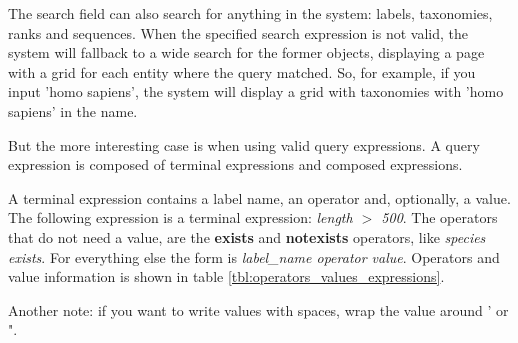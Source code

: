 The search field can also search for anything in the system: labels, taxonomies, ranks and sequences.
When the specified search expression is not valid, the system will fallback to a wide search for the
former objects, displaying a page with a grid for each entity where the query matched. So, for example,
if you input 'homo sapiens', the system will display a grid with taxonomies with 'homo sapiens' in the name.

But the more interesting case is when using valid query expressions. A query expression
is composed of terminal expressions and composed expressions.

A terminal expression contains a label name, an operator and, optionally, a value.
The following expression is a terminal expression: \textit{length $>$ 500}. The operators that
do not need a value, are the \textbf{exists} and \textbf{notexists} operators, like \textit{species exists}.
For everything else the form is \textit{label\_name operator value}. Operators and value information
is shown in table \ref{tbl:operators_values_expressions}.

Another note: if you want to write values with spaces, wrap the value around ' or ".

